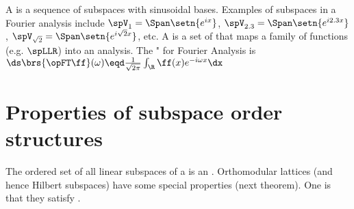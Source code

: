 \begin{example}
A  is a sequence of subspaces with sinusoidal bases.
  Examples of subspaces in a Fourier analysis include $\spV_1=\Span\setn{e^{ix}}$, 
  $\spV_{2.3}=\Span\setn{e^{i2.3x}}$, $\spV_{\sqrt{2}}=\Span\setn{e^{i\sqrt{2}x}}$, etc.
  A  is a set of  that maps a family of functions (e.g. $\spLLR$)
  into an analysis.
  The " for Fourier Analysis is 
  \\\indentx$\ds\brs{\opFT\ff}(\omega) \eqd \frac{1}{\sqrt{2\pi}} \int_\R \ff(x) e^{-i\omega x} \dx$
\end{example}



\section{Properties of subspace order structures}
The ordered set of all linear subspaces of a  is an .
Orthomodular lattices (and hence Hilbert subspaces) have some special properties (next theorem).
One is that they satisfy .

